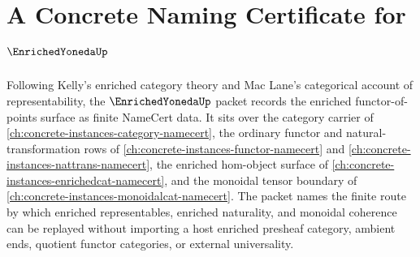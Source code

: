 \chapter{A Concrete Naming Certificate for $\EnrichedYonedaUp$}
\label{ch:concrete-instances-enriched-yoneda-namecert}

Following Kelly's enriched category theory and Mac Lane's categorical account of
representability, the $\EnrichedYonedaUp$ packet records the enriched
functor-of-points surface as finite NameCert data. It sits over the category
carrier of \autoref{ch:concrete-instances-category-namecert}, the ordinary
functor and natural-transformation rows of
\autoref{ch:concrete-instances-functor-namecert} and
\autoref{ch:concrete-instances-nattrans-namecert}, the enriched hom-object
surface of \autoref{ch:concrete-instances-enrichedcat-namecert}, and the
monoidal tensor boundary of
\autoref{ch:concrete-instances-monoidalcat-namecert}. The packet names the
finite route by which enriched representables, enriched naturality, and
monoidal coherence can be replayed without importing a host enriched presheaf
category, ambient ends, quotient functor categories, or external universality.

